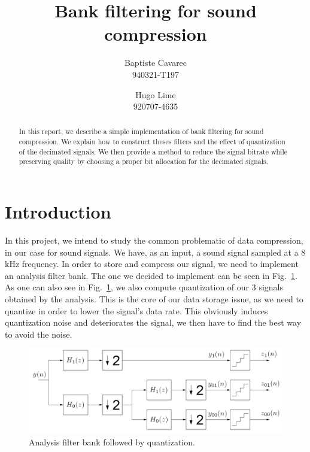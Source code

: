 \documentclass[a4paper,twocolumn]{article}
\begin{document}
\title{Bank filtering for sound compression}
\author{Baptiste Cavarec \\ 940321-T197 \and Hugo Lime\\
  920707-4635}

\maketitle


\begin{abstract}
In this report, we describe a simple implementation of bank filtering for sound compression. We explain how to construct theses filters and the effect of quantization of the decimated signals. We then provide a method to reduce the signal bitrate while preserving quality by choosing a proper bit allocation for the decimated signals.
\end{abstract}

\section{Introduction}
\label{sec:intro}

In this project, we intend to study the common problematic of data compression, in our case for sound signals. We have, as an input, a sound signal sampled at a 8 kHz frequency. In order to store and compress our signal, we need to implement an analysis filter bank. The one we decided to implement can be seen in Fig.~\ref{fig:analysis}. As one can also see in Fig.~\ref{fig:analysis}, we also compute quantization of our 3 signals obtained by the analysis. This is the core of our data storage issue, as we need to quantize in order to lower the signal's data rate. This obviously induces quantization noise and deteriorates the signal, we then have to find the best way to avoid the noise.

\begin{figure}[!ht]
  \begin{center}
    \includegraphics[width=0.83\columnwidth]{analysis.png}
  \end{center}
  \caption{Analysis filter bank followed by quantization.}
  \label{fig:analysis}
\end{figure}
\end{document}
